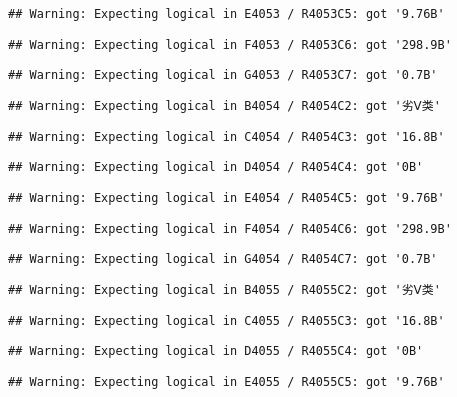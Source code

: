 \documentclass[
]{article}
\begin{document}
\begin{verbatim}
## Warning: Expecting logical in E4053 / R4053C5: got '9.76B'
\end{verbatim}

\begin{verbatim}
## Warning: Expecting logical in F4053 / R4053C6: got '298.9B'
\end{verbatim}

\begin{verbatim}
## Warning: Expecting logical in G4053 / R4053C7: got '0.7B'
\end{verbatim}

\begin{verbatim}
## Warning: Expecting logical in B4054 / R4054C2: got '劣Ⅴ类'
\end{verbatim}

\begin{verbatim}
## Warning: Expecting logical in C4054 / R4054C3: got '16.8B'
\end{verbatim}

\begin{verbatim}
## Warning: Expecting logical in D4054 / R4054C4: got '0B'
\end{verbatim}

\begin{verbatim}
## Warning: Expecting logical in E4054 / R4054C5: got '9.76B'
\end{verbatim}

\begin{verbatim}
## Warning: Expecting logical in F4054 / R4054C6: got '298.9B'
\end{verbatim}

\begin{verbatim}
## Warning: Expecting logical in G4054 / R4054C7: got '0.7B'
\end{verbatim}

\begin{verbatim}
## Warning: Expecting logical in B4055 / R4055C2: got '劣Ⅴ类'
\end{verbatim}

\begin{verbatim}
## Warning: Expecting logical in C4055 / R4055C3: got '16.8B'
\end{verbatim}

\begin{verbatim}
## Warning: Expecting logical in D4055 / R4055C4: got '0B'
\end{verbatim}

\begin{verbatim}
## Warning: Expecting logical in E4055 / R4055C5: got '9.76B'
\end{verbatim}
\end{document}
